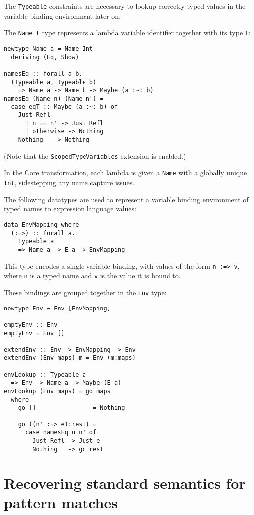 \documentclass[sigplan,screen]{acmart}
\newcommand{\ttt}{\texttt}
\begin{document}
The \ttt{Typeable} constraints are necessary to lookup correctly typed
values in the variable binding environment later on.

The \ttt{Name t} type represents a lambda variable identifier together with its
type \ttt{t}:

\begin{lstlisting}
newtype Name a = Name Int
  deriving (Eq, Show)

namesEq :: forall a b.
  (Typeable a, Typeable b)
    => Name a -> Name b -> Maybe (a :~: b)
namesEq (Name n) (Name n') =
  case eqT :: Maybe (a :~: b) of
    Just Refl
      | n == n' -> Just Refl
      | otherwise -> Nothing
    Nothing   -> Nothing
\end{lstlisting}

(Note that the \ttt{ScopedTypeVariables} extension is enabled.)

In the Core transformation, each lambda is given a \ttt{Name} with a globally
unique \ttt{Int}, sidestepping any name capture issues.

The following datatypes are used to represent a variable binding environment
of typed names to expression language values:

\begin{lstlisting}
data EnvMapping where
  (:=>) :: forall a.
    Typeable a
    => Name a -> E a -> EnvMapping
\end{lstlisting}

This type encodes a single variable binding, with values of the form
\ttt{n :=> v}, where \ttt{n} is a typed name and \ttt{v} is the value it is bound to.

These bindings are grouped together in the \ttt{Env} type:

\begin{lstlisting}
newtype Env = Env [EnvMapping]

emptyEnv :: Env
emptyEnv = Env []

extendEnv :: Env -> EnvMapping -> Env
extendEnv (Env maps) m = Env (m:maps)

envLookup :: Typeable a
  => Env -> Name a -> Maybe (E a)
envLookup (Env maps) = go maps
  where
    go []                = Nothing

    go ((n' :=> e):rest) =
      case namesEq n n' of
        Just Refl -> Just e
        Nothing   -> go rest
\end{lstlisting}


\section{Recovering standard semantics for pattern matches}
\end{document}
